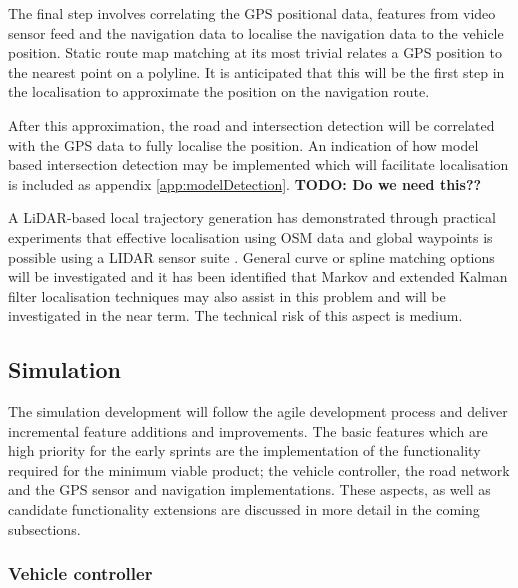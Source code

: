 \documentclass[]{aiaa-tc}%
\begin{document}
The final step involves correlating the GPS positional data, features from video sensor feed and the navigation data to localise the navigation data to the vehicle position. Static route map matching at its most trivial relates a GPS position to the nearest point on a polyline. It is anticipated that this will be the first step in the localisation to approximate the position on the navigation route. 

After this approximation, the road and intersection detection will be correlated with the GPS data to fully localise the position. An indication of how model based intersection detection \citep{modelBasedIntersection} may be implemented which will facilitate localisation is included as appendix \ref{app:modelDetection}. \textbf{TODO: Do we need this??}


A LiDAR-based local trajectory generation has demonstrated through practical experiments that effective localisation using OSM data and global waypoints is possible using a LIDAR sensor suite \cite{mitLocalNavDriving}. General curve or spline matching options will be investigated and it has been identified that Markov and extended Kalman filter localisation techniques may also assist in this problem \citep{probabalisticRobotics} and will be investigated in the near term. The technical risk of this aspect is medium.

\subsection{Simulation}

The simulation development will follow the agile development process and deliver incremental feature additions and improvements. The basic features which are high priority for the early sprints are the implementation of the functionality required for the minimum viable product; the vehicle controller, the road network and the GPS sensor and navigation implementations. These aspects, as well as candidate functionality extensions are discussed in more detail in the coming subsections.

\subsubsection{Vehicle controller}
\end{document}
